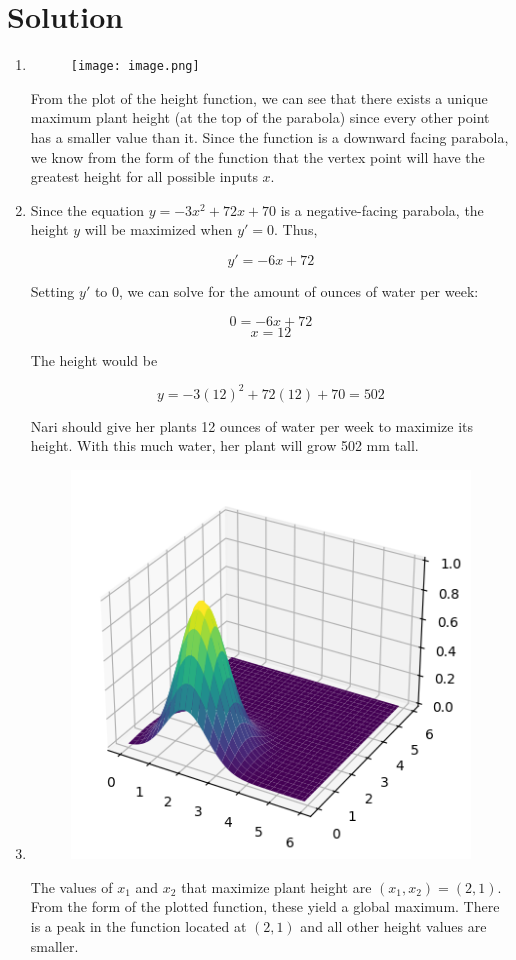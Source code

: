 \documentclass{../harvardml}
\theoremstyle{definition}
\theoremstyle{plain}
\newenvironment{solution}
  {\color{blue}\section*{Solution}}
{}
\begin{document}
\newpage


\begin{solution}
	\begin{enumerate}
	    \item 
            \begin{figure}[H]
                \centering
                \texttt{[image: image.png]}
            \end{figure}
            From the plot of the height function, we can see that there exists a unique maximum plant height (at the top of the parabola) since every other point has a smaller value than it. Since the function is a downward facing parabola, we know from the form of the function that the vertex point will have the greatest height for all possible inputs $x$.
            
                        \item Since the equation $y = -3x^2 + 72x + 70$ is a negative-facing parabola, the height $y$ will be maximized when $y'=0$. Thus,
            
\[             y' = -6x + 72             \]
            
            Setting $y'$ to 0, we can solve for the amount of ounces of water per week:

            \[
            0 = -6x + 72
            \]
            \[
            x = 12
            \]

            The height would be

            \[
            y = -3(12)^2 + 72(12) + 70 = 502
            \]

            Nari should give her plants 12 ounces of water per week to maximize its height. With this much water, her plant will grow 502 mm tall.
        \item 
\begin{figure}[H]
    \centering
    \includegraphics[width=0.25\linewidth]{image2.png}
\end{figure}
        The values of $x_1$ and $x_2$ that maximize plant height are $(x_1, x_2) = (2, 1)$. From the form of the plotted function, these yield a global maximum. There is a peak in the function located at $(2, 1)$ and all other height values are smaller.
\end{enumerate}
\end{solution}
\end{document}
